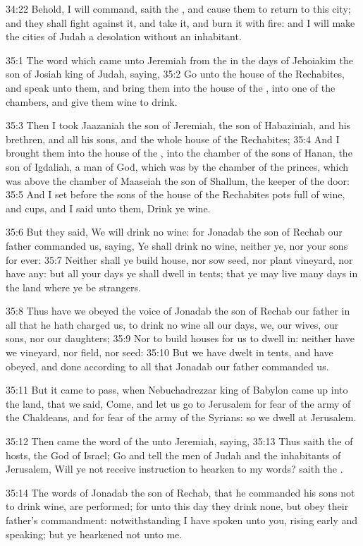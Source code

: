 34:22 Behold, I will command, saith the \LORD, and cause them to return to this city; and they shall fight against it, and take it, and burn it with fire: and I will make the cities of Judah a desolation without an inhabitant.

35:1 The word which came unto Jeremiah from the \LORD in the days of Jehoiakim the son of Josiah king of Judah, saying, 35:2 Go unto the house of the Rechabites, and speak unto them, and bring them into the house of the \LORD, into one of the chambers, and give them wine to drink.

35:3 Then I took Jaazaniah the son of Jeremiah, the son of Habaziniah, and his brethren, and all his sons, and the whole house of the Rechabites; 35:4 And I brought them into the house of the \LORD, into the chamber of the sons of Hanan, the son of Igdaliah, a man of God, which was by the chamber of the princes, which was above the chamber of Maaseiah the son of Shallum, the keeper of the door: 35:5 And I set before the sons of the house of the Rechabites pots full of wine, and cups, and I said unto them, Drink ye wine.

35:6 But they said, We will drink no wine: for Jonadab the son of Rechab our father commanded us, saying, Ye shall drink no wine, neither ye, nor your sons for ever: 35:7 Neither shall ye build house, nor sow seed, nor plant vineyard, nor have any: but all your days ye shall dwell in tents; that ye may live many days in the land where ye be strangers.

35:8 Thus have we obeyed the voice of Jonadab the son of Rechab our father in all that he hath charged us, to drink no wine all our days, we, our wives, our sons, nor our daughters; 35:9 Nor to build houses for us to dwell in: neither have we vineyard, nor field, nor seed: 35:10 But we have dwelt in tents, and have obeyed, and done according to all that Jonadab our father commanded us.

35:11 But it came to pass, when Nebuchadrezzar king of Babylon came up into the land, that we said, Come, and let us go to Jerusalem for fear of the army of the Chaldeans, and for fear of the army of the Syrians: so we dwell at Jerusalem.

35:12 Then came the word of the \LORD unto Jeremiah, saying, 35:13 Thus saith the \LORD of hosts, the God of Israel; Go and tell the men of Judah and the inhabitants of Jerusalem, Will ye not receive instruction to hearken to my words? saith the \LORD.

35:14 The words of Jonadab the son of Rechab, that he commanded his sons not to drink wine, are performed; for unto this day they drink none, but obey their father's commandment: notwithstanding I have spoken unto you, rising early and speaking; but ye hearkened not unto me.

